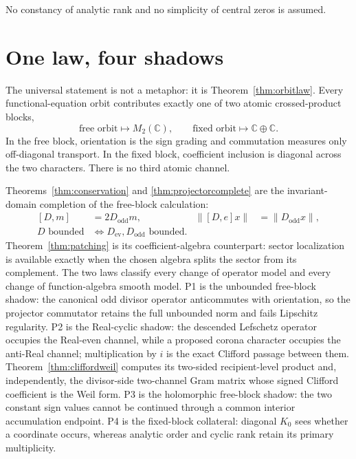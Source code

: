 \documentclass[11pt,reqno]{amsart}
\newcommand{\C}{\mathbb C}
\begin{document}
No constancy of analytic rank and no simplicity of central zeros is assumed.

\section{One law, four shadows}\label{sec:synthesis}

The universal statement is not a metaphor: it is Theorem~\ref{thm:orbitlaw}.  Every
functional-equation orbit contributes exactly one of two atomic crossed-product blocks,
\[
 \text{free orbit}\longmapsto M_2(\C),\qquad
 \text{fixed orbit}\longmapsto\C\oplus\C.            \tag{7.1}
\]
In the free block, orientation is the sign grading and commutation measures only off-diagonal
transport.  In the fixed block, coefficient inclusion is diagonal across the two characters.
There is no third atomic channel.

Theorems~\ref{thm:conservation} and \ref{thm:projectorcomplete} are the invariant-domain completion
of the free-block calculation:
\begin{equation}
 \begin{aligned}
 [D,m]&=2D_{\mathrm{odd}}m,
 &\|[D,e]x\|&=\|D_{\mathrm{odd}}x\|,\\
 D\text{ bounded}&\Longleftrightarrow
 D_{\mathrm{ev}},D_{\mathrm{odd}}\text{ bounded}.
 \end{aligned}
\tag{7.2}
\end{equation}
Theorem~\ref{thm:patching} is its coefficient-algebra counterpart: sector localization is
available exactly when the chosen algebra splits the sector from its complement.  The two laws
classify every change of operator model and every change of function-algebra smooth model.
P1 is the unbounded free-block shadow: the canonical odd divisor operator anticommutes with
orientation, so the projector commutator retains the full unbounded norm and fails Lipschitz
regularity.  P2 is the Real-cyclic shadow: the descended Lefschetz operator occupies the Real-even
channel, while a proposed corona character occupies the anti-Real channel; multiplication by $i$
is the exact Clifford passage between them.  Theorem~\ref{thm:cliffordweil} computes its two-sided
recipient-level product and, independently, the divisor-side two-channel Gram matrix whose signed
Clifford coefficient is the Weil form.  P3 is the holomorphic free-block shadow: the two
constant sign values cannot be continued through a common interior accumulation endpoint.  P4 is
the fixed-block collateral: diagonal $K_0$ sees whether a coordinate occurs, whereas analytic
order and cyclic rank retain its primary multiplicity.
\end{document}
